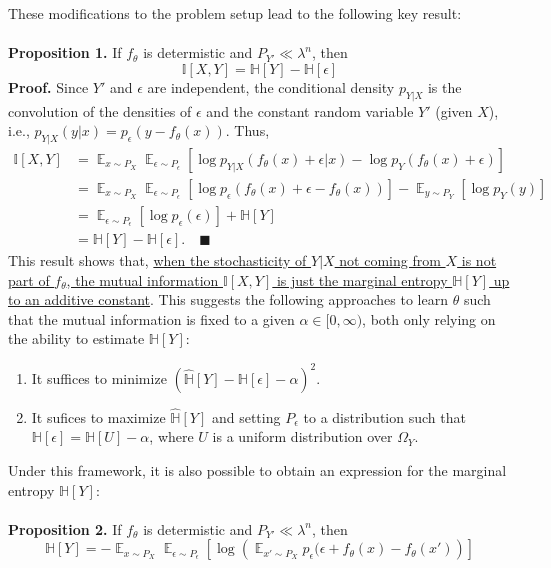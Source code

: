 \documentclass{NSF}
\newcommand{\E} {
    \mathop{\mathbb{E}}
}
\begin{document}
These modifications to the problem setup lead to the following key result:
\\
\\
\textbf{Proposition 1.} If $f_\theta$ is determistic and $P_{Y'} \ll \lambda^n$, then
\[
    \mathbb{I}[X,Y]
    = \mathbb{H}[Y] - \mathbb{H}[\epsilon]
\]
\textbf{Proof.} Since $Y'$ and $\epsilon$ are independent, the conditional density
$p_{Y|X}$ is the convolution of the densities of $\epsilon$ and the constant random
variable $Y'$ (given $X$), i.e., $p_{Y|X}(y|x) = p_\epsilon(y - f_\theta(x))$. Thus,
\begin{align*}
    \mathbb{I}[X,Y]
    &= \E_{x\sim P_X} \E_{\epsilon \sim P_\epsilon} \left[
       \log p_{Y|X}(f_\theta(x) + \epsilon|x) - \log p_Y(f_\theta(x) + \epsilon) \right]
    \\
    &= \E_{x\sim P_X} \E_{\epsilon \sim P_\epsilon}
       \left[ \log p_\epsilon(f_\theta(x) + \epsilon - f_\theta(x)) \right]
       - \E_{y\sim P_Y} \left[ \log p_Y(y) \right]
    \\
    &= \E_{\epsilon \sim P_\epsilon} \left[ \log p_\epsilon(\epsilon) \right]
       + \mathbb{H}[Y]
    \\
    &= \mathbb{H}[Y] - \mathbb{H}[\epsilon].
    \quad\blacksquare
\end{align*}
This result shows that, \ul{when the stochasticity of $Y|X$ not coming from $X$
is not part of $f_\theta$, the mutual information $\mathbb{I}[X,Y]$ is just the marginal
entropy $\mathbb{H}[Y]$ up to an additive constant}. This suggests the following
approaches to learn $\theta$ such that the mutual information is fixed to a given
$\alpha \in [0,\infty)$, both only relying on the ability to estimate $\mathbb{H}[Y]$:
\begin{enumerate}
\item It suffices to minimize
$\left(\hat{\mathbb{H}}[Y] - \mathbb{H}[\epsilon] - \alpha\right)^2$.
\item It sufices to maximize $\hat{\mathbb{H}}[Y]$ and setting $P_\epsilon$ to a
distribution such that $\mathbb{H}[\epsilon] = \mathbb{H}[U] - \alpha$, where $U$ is a
uniform distribution over $\Omega_Y$.
\end{enumerate}
Under this framework, it is also possible to obtain an expression for the marginal entropy $\mathbb{H}[Y]$:
\\
\\
\textbf{Proposition 2.} If $f_\theta$ is determistic and
$P_{Y'} \ll \lambda^n$, then
\[
    \mathbb{H}[Y]
    = - \E_{x\sim P_X} \E_{\epsilon\sim P_\epsilon} \left[ \log \left(
      \E_{x' \sim P_X} p_\epsilon(\epsilon + f_\theta(x) - f_\theta(x')
      \right) \right]
\]
\end{document}
